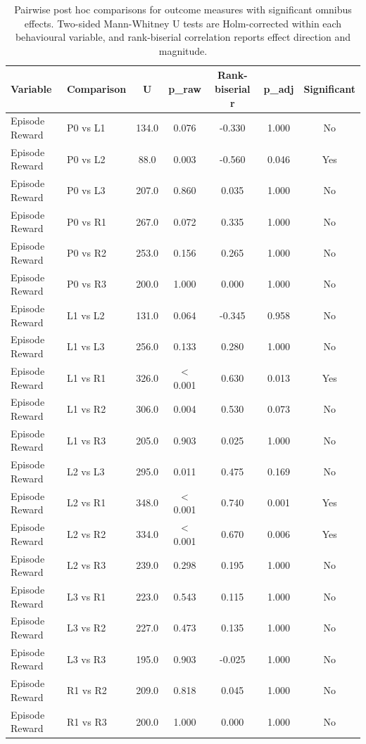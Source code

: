 \begin{table}[t]
\centering
\caption{Pairwise post hoc comparisons for outcome measures with significant omnibus effects. Two-sided Mann-Whitney U tests are Holm-corrected within each behavioural variable, and rank-biserial correlation reports effect direction and magnitude.}
\label{tab:pairwise_posthoc}
\begin{tabular}{l l c c c c c}
\hline
Variable & Comparison & U & p\_raw & Rank-biserial r & p\_adj & Significant \\
\hline
Episode Reward & P0 vs L1 & 134.0 & 0.076 & -0.330 & 1.000 & No \\
Episode Reward & P0 vs L2 & 88.0 & 0.003 & -0.560 & 0.046 & Yes \\
Episode Reward & P0 vs L3 & 207.0 & 0.860 & 0.035 & 1.000 & No \\
Episode Reward & P0 vs R1 & 267.0 & 0.072 & 0.335 & 1.000 & No \\
Episode Reward & P0 vs R2 & 253.0 & 0.156 & 0.265 & 1.000 & No \\
Episode Reward & P0 vs R3 & 200.0 & 1.000 & 0.000 & 1.000 & No \\
Episode Reward & L1 vs L2 & 131.0 & 0.064 & -0.345 & 0.958 & No \\
Episode Reward & L1 vs L3 & 256.0 & 0.133 & 0.280 & 1.000 & No \\
Episode Reward & L1 vs R1 & 326.0 & < 0.001 & 0.630 & 0.013 & Yes \\
Episode Reward & L1 vs R2 & 306.0 & 0.004 & 0.530 & 0.073 & No \\
Episode Reward & L1 vs R3 & 205.0 & 0.903 & 0.025 & 1.000 & No \\
Episode Reward & L2 vs L3 & 295.0 & 0.011 & 0.475 & 0.169 & No \\
Episode Reward & L2 vs R1 & 348.0 & < 0.001 & 0.740 & 0.001 & Yes \\
Episode Reward & L2 vs R2 & 334.0 & < 0.001 & 0.670 & 0.006 & Yes \\
Episode Reward & L2 vs R3 & 239.0 & 0.298 & 0.195 & 1.000 & No \\
Episode Reward & L3 vs R1 & 223.0 & 0.543 & 0.115 & 1.000 & No \\
Episode Reward & L3 vs R2 & 227.0 & 0.473 & 0.135 & 1.000 & No \\
Episode Reward & L3 vs R3 & 195.0 & 0.903 & -0.025 & 1.000 & No \\
Episode Reward & R1 vs R2 & 209.0 & 0.818 & 0.045 & 1.000 & No \\
Episode Reward & R1 vs R3 & 200.0 & 1.000 & 0.000 & 1.000 & No \\

\end{tabular}
\end{table}
